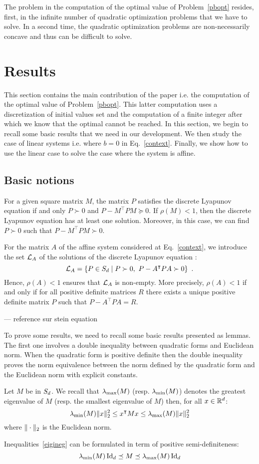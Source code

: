 \documentclass[10pt]{article}
\newcommand\ForAuthors[1]%
 {\par\smallskip                     %
  \begin{center}%
   \fbox%
   {\parbox{0.9\linewidth}%
    {\raggedright\sc--- #1}%
   }%
  \end{center}%
  \par\smallskip                     %
 }
\begin{document}
The problem in the computation of the optimal value of Problem~\eqref{pbopt} resides, first, in the infinite number of quadratic optimization problems that we have to solve. In a second time, the quadratic optimization problems are non-necessarily concave and thus can be difficult to solve. 
\section{Results}

This section contains the main contribution of the paper i.e. the computation of the optimal value of Problem~\eqref{pbopt}. This latter computation uses a discretization of initial values set and the computation of a finite integer after which we know that the optimal cannot be reached. In this section, we begin to recall some basic results that we need in our development. We then study the case of linear systems i.e. where $b=0$ in Eq.~\eqref{context}. Finally, we show how to use the linear case to solve the case where the system is affine.   
\subsection{Basic notions}

For a given square matrix $M$, the matrix $P$ satisfies the discrete Lyapunov equation if and only $P\succ 0$ and $P-M^\intercal P M\succeq 0$. If $\rho(M)<1$, then the discrete Lyapunov equation has at least one solution. Moreover, in this case, we can find $P\succ 0$ such that $P-M^\intercal P M\succ 0$.  

For the matrix $A$ of the affine system considered at Eq.~\eqref{context}, we introduce the set $\mathcal{L}_{A}$ of the  solutions  of the discrete Lyapunov equation :
\[
\mathcal{L}_{A}=\{P\in S_d \mid P\succ 0,\ P-A^\intercal P A\succ 0\}\enspace .
\]
Hence, $\rho(A)<1$ ensures that $\mathcal{L}_{A}$ is non-empty. More precisely, $\rho(A)<1$ if and only if for all positive definite matrices $R$ there exists a unique positive definite matrix $P$ such that $P-A^\intercal P A=R$. \ForAuthors{reference sur stein equation}

To prove some results, we need to recall some basic results presented as lemmas. The first one involves a double inequality between quadratic forms and Euclidean norm. When the quadratic form is positive definite then the double inequality proves the norm equivalence between the norm defined by the quadratic form and the Euclidean norm with explicit constants. 
\begin{lemma}
\label{lemma1}
Let $M$ be in $S_d$. We recall that $\lambda_{\operatorname{max}}(M)$ (resp. $\lambda_{\operatorname{min}}(M)$) denotes the greatest eigenvalue of $M$ (resp. the smallest eigenvalue of $M$) then, for all $x\in \mathbb R^d$:
\begin{equation}
\label{eigineg}
\lambda_{\operatorname{min}}(M)\| x\|_2^2\leq x^\intercal M x\leq \lambda_{\operatorname{max}}(M) \| x\|_2^2
\end{equation}
where $\| \cdot\|_2$ is the Euclidean norm. 
\end{lemma}
Inequalities~\eqref{eigineg} can be formulated in term of positive semi-definiteness:
\[
\lambda_{\operatorname{min}}(M)\operatorname{Id}_d\preceq M\preceq \lambda_{\operatorname{max}}(M)\operatorname{Id}_d
\]
\end{document}

